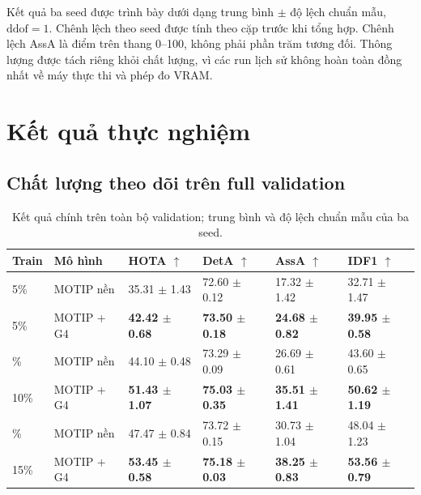 Kết quả ba seed được trình bày dưới dạng trung bình \ensuremath{\pm} độ lệch chuẩn mẫu, $\mathrm{ddof}=1$. Chênh lệch theo seed được tính theo cặp trước khi tổng hợp. Chênh lệch AssA là điểm trên thang 0–100, không phải phần trăm tương đối. Thông lượng được tách riêng khỏi chất lượng, vì các run lịch sử không hoàn toàn đồng nhất về máy thực thi và phép đo VRAM.

\FloatBarrier
\section{Kết quả thực nghiệm}
\FloatBarrier
\subsection{Chất lượng theo dõi trên full validation}
\begin{table}[!htbp]
\centering
\caption{Kết quả chính trên toàn bộ validation; trung bình và độ lệch chuẩn mẫu của ba seed.}\label{tab:4}

\small\setlength{\tabcolsep}{4.2pt}
\begin{tabular}{llllll}
\toprule
\textbf{Train} & \textbf{Mô hình} & \textbf{HOTA \ensuremath{\uparrow}} & \textbf{DetA \ensuremath{\uparrow}} & \textbf{AssA \ensuremath{\uparrow}} & \textbf{IDF1 \ensuremath{\uparrow}} \\
\midrule
5\% & MOTIP nền & 35.31 \ensuremath{\pm} 1.43 & 72.60 \ensuremath{\pm} 0.12 & 17.32 \ensuremath{\pm} 1.42 & 32.71 \ensuremath{\pm} 1.47 \\
5\% & MOTIP + G4 & \textbf{42.42 \ensuremath{\pm} 0.68} & \textbf{73.50 \ensuremath{\pm} 0.18} & \textbf{24.68 \ensuremath{\pm} 0.82} & \textbf{39.95 \ensuremath{\pm} 0.58} \\
\addlinespace[4pt]
10\% & MOTIP nền & 44.10 \ensuremath{\pm} 0.48 & 73.29 \ensuremath{\pm} 0.09 & 26.69 \ensuremath{\pm} 0.61 & 43.60 \ensuremath{\pm} 0.65 \\
10\% & MOTIP + G4 & \textbf{51.43 \ensuremath{\pm} 1.07} & \textbf{75.03 \ensuremath{\pm} 0.35} & \textbf{35.51 \ensuremath{\pm} 1.41} & \textbf{50.62 \ensuremath{\pm} 1.19} \\
\addlinespace[4pt]
15\% & MOTIP nền & 47.47 \ensuremath{\pm} 0.84 & 73.72 \ensuremath{\pm} 0.15 & 30.73 \ensuremath{\pm} 1.04 & 48.04 \ensuremath{\pm} 1.23 \\
15\% & MOTIP + G4 & \textbf{53.45 \ensuremath{\pm} 0.58} & \textbf{75.18 \ensuremath{\pm} 0.03} & \textbf{38.25 \ensuremath{\pm} 0.83} & \textbf{53.56 \ensuremath{\pm} 0.79} \\
\bottomrule
\end{tabular}
\end{table}

